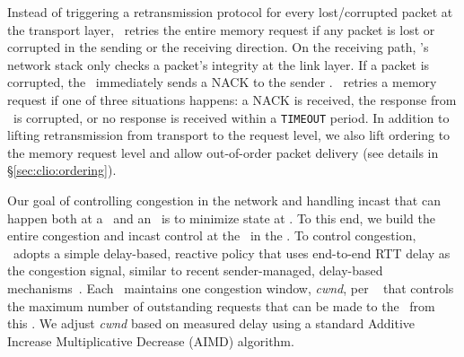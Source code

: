Instead of triggering a retransmission protocol for every lost/corrupted packet at the transport layer, 
\syslib\ retries the entire memory request if any packet is lost or corrupted in the sending or the receiving direction.
On the receiving path, \MN{}'s network stack only checks a packet's integrity at the link layer. If a packet is corrupted, the \MN\ immediately sends a NACK to the sender \CN.
\syslib\ retries a memory request if one of three situations happens: a NACK is received, the response from \MN\ is corrupted, or no response is received within a \texttt{TIMEOUT} period.
In addition to lifting retransmission from transport to the request level, we also lift ordering to the memory request level
and allow out-of-order packet delivery (see details in \S\ref{sec:clio:ordering}).

Our goal of controlling congestion in the network and handling incast that can happen both at a \CN\ and an \MN\ is to minimize state at \MN.
To this end, we build the entire congestion and incast control at the \CN\ in the \syslib.
To control congestion, \syslib\ adopts a simple delay-based, reactive policy that uses end-to-end RTT delay as the congestion signal, similar to recent sender-managed, delay-based mechanisms~\cite{mittal2015timely,swift-sigcomm,1RMA}.
Each \CN\ maintains one congestion window, \textit{cwnd}, per \MN\ 
that controls the maximum number of outstanding requests that can be made to the \MN\ from this \CN.
We adjust \textit{cwnd} based on measured delay using a standard Additive Increase Multiplicative Decrease (AIMD) algorithm.

